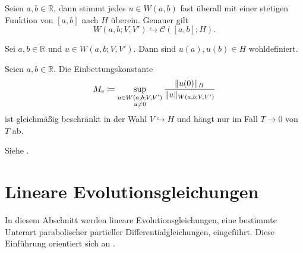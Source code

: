 \begin{Satz}
\label{satz:gl:einbettung_bochner_stetig}
    Seien $a, b \in \mathbb{R}$, dann stimmt jedes $u \in W(a, b)$ fast überall mit einer stetigen Funktion von $[a, b]$ nach $H$ überein.
    Genauer gilt
    \begin{equation}
        W(a, b; V, V') \hookrightarrow \mathcal C([a, b]; H).
    \end{equation}
\end{Satz}

\begin{Korollar}
\label{korollar:gl:spur_wohldefiniert}
    Sei $a, b \in \mathbb{R}$ und $u \in W(a, b; V, V')$.
    Dann sind $u(a), u(b) \in H$ wohldefiniert.
\end{Korollar}

\begin{Korollar}
\label{korollar:gl:einbettungskonstante_M_e}
    Seien $a, b \in \mathbb{R}$.
    Die Einbettungskonstante
    \begin{equation}
        \label{eq:gl:einbettungskonst_M_e}
        M_{e} \coloneqq \sup_{\substack{u\in W(a, b; V, V')\\u \neq 0}} \frac{\lVert u(0)\rVert_{H}}{\lVert u\rVert_{W(a, b; V, V')}}
    \end{equation}
    ist gleichmäßig beschränkt in der Wahl $V \hookrightarrow H$ und hängt nur im Fall $T \to 0$ von $T$ ab.

    \begin{Beweis}
        Siehe \textcite[Beweis zu Theorem XVIII.2.1]{Dautray:1992by}.
    \end{Beweis}
\end{Korollar}


\section{Lineare Evolutionsgleichungen} %
\label{sec:lineare_evolutionsgleichungen}
\label{sec:allgemeine_problemstellung}
\label{sec:raum_zeit_variationsformulierung}

In diesem Abschnitt werden lineare Evolutionsgleichungen, eine bestimmte Unterart parabolischer partieller Differentialgleichungen, eingeführt.
Diese Einführung orientiert sich an \textcite{Lions:1971wp,Schwab:2009ec,Urban:2014kg}.

